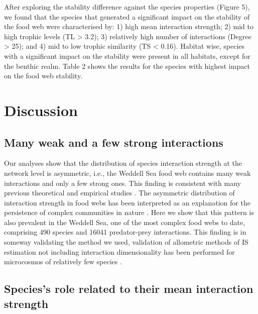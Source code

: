 \documentclass[gc, manuscript]{copernicus}
\begin{document}
After exploring the stability difference against the species properties
(Figure 5), we found that the species that generated a significant
impact on the stability of the food web were characterised by: 1) high
mean interaction strength; 2) mid to high trophic levels (TL
\textgreater{} 3.2); 3) relatively high number of interactions (Degree
\textgreater{} 25); and 4) mid to low trophic similarity (TS \textless{}
0.16). Habitat wise, species with a significant impact on the stability
were present in all habitats, except for the benthic realm. Table 2
shows the results for the species with highest impact on the food web
stability.

\section{Discussion}

\subsection{Many weak and a few strong interactions}

Our analyses show that the distribution of species interaction strength
at the network level is asymmetric, i.e., the Weddell Sea food web
contains many weak interactions and only a few strong ones. This finding
is consistent with many previous theoretical and empirical studies
\citep[e.g.][]{McCann1998, Neutel2002, Emmerson2004, Wootton2005, Kortsch2021}.
The asymmetric distribution of interaction strength in food webs has
been interpreted as an explanation for the persistence of complex
communities in nature \citep{Bascompte2005, Allesina2015, Nilsson2016}.
Here we show that this pattern is also prevalent in the Weddell Sea, one
of the most complex food webs to date, comprising 490 species and 16041
predator-prey interactions. This finding is in someway validating the
method we used, validation of allometric methods of IS estimation not
including interaction dimensionality has been performed for microcosmos
of relatively few species \citep{Jonsson2018}.

\subsection{Species's role related to their mean interaction strength}
\end{document}
